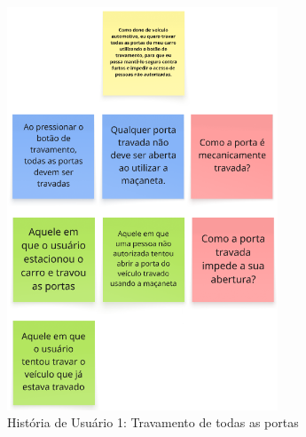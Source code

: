 
\begin{figure}[ht]
\centering
\includegraphics[height=12cm]{figuras/user_story_1.png}
\caption{História de Usuário 1: Travamento de todas as portas}
\end{figure}

